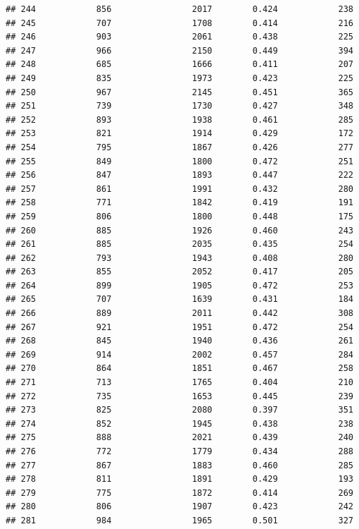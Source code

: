 \documentclass[]{book}
\begin{document}
\begin{verbatim}
## 244            856                2017        0.424            238
## 245            707                1708        0.414            216
## 246            903                2061        0.438            225
## 247            966                2150        0.449            394
## 248            685                1666        0.411            207
## 249            835                1973        0.423            225
## 250            967                2145        0.451            365
## 251            739                1730        0.427            348
## 252            893                1938        0.461            285
## 253            821                1914        0.429            172
## 254            795                1867        0.426            277
## 255            849                1800        0.472            251
## 256            847                1893        0.447            222
## 257            861                1991        0.432            280
## 258            771                1842        0.419            191
## 259            806                1800        0.448            175
## 260            885                1926        0.460            243
## 261            885                2035        0.435            254
## 262            793                1943        0.408            280
## 263            855                2052        0.417            205
## 264            899                1905        0.472            253
## 265            707                1639        0.431            184
## 266            889                2011        0.442            308
## 267            921                1951        0.472            254
## 268            845                1940        0.436            261
## 269            914                2002        0.457            284
## 270            864                1851        0.467            258
## 271            713                1765        0.404            210
## 272            735                1653        0.445            239
## 273            825                2080        0.397            351
## 274            852                1945        0.438            238
## 275            888                2021        0.439            240
## 276            772                1779        0.434            288
## 277            867                1883        0.460            285
## 278            811                1891        0.429            193
## 279            775                1872        0.414            269
## 280            806                1907        0.423            242
## 281            984                1965        0.501            327

\end{verbatim}
\end{document}
